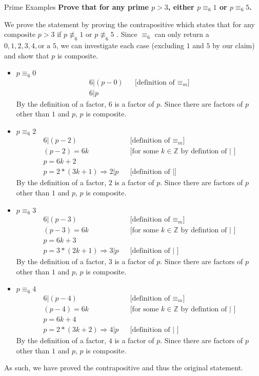 \documentclass[11pt, nopagenumbers]{adamblan-hw}
\begin{document}
\begin{question}{Prime Examples}
\textbf{Prove that for any prime $p > 3$, either $p \equiv_6 1$ or $p \equiv_6 5$.}

We prove the statement by proving the contrapositive which states that for any composite $p > 3$
if $p \not\equiv_6 1$ or $p \not\equiv_6 5$ . Since $\equiv_6$ can only return a
$0, 1, 2, 3, 4, \text{or a } 5$, we can investigate each case (excluding $1$ and $5$
by our claim) and show that $p$ is composite.

\begin{itemize}
\item{$p \equiv_6 0$}
\begin{align*}
6 | (p - 0) && \text{[definition of $\equiv_m$]} \\
6 | p
\end{align*}
By the definition of a factor, $6$ is a factor of $p$. Since there are factors of
$p$ other than $1$ and $p$, $p$ is composite. 

\item{$p \equiv_6 2$}
\begin{align*}
    6 | (p - 2) && \text{[definition of $\equiv_m$]} \\
    (p - 2) = 6k && \text{[for some $k \in \mathbb{Z}$ by defintion of | ]} \\
    p = 6k + 2 \\
    p = 2 * (3k + 1) \Rightarrow
    2 | p && \text{[definition of |]}
    \end{align*}
    By the definition of a factor, $2$ is a factor of $p$. Since there are factors of
    $p$ other than $1$ and $p$, $p$ is composite. 

\item{$p \equiv_6 3$}
\begin{align*}
    6 | (p - 3) && \text{[definition of $\equiv_m$]} \\
    (p - 3) = 6k && \text{[for some $k \in \mathbb{Z}$ by defintion of | ]} \\
    p = 6k + 3 \\
    p = 3 * (2k + 1) \Rightarrow
    3 | p && \text{[definition of | ]}
    \end{align*}
    By the definition of a factor, $3$ is a factor of $p$. Since there are factors of
    $p$ other than $1$ and $p$, $p$ is composite. 

\item{$p \equiv_6 4$}
    \begin{align*}
        6 | (p - 4) && \text{[definition of $\equiv_m$]} \\
        (p - 4) = 6k && \text{[for some $k \in \mathbb{Z}$ by defintion of | ]} \\
        p = 6k + 4 \\
        p = 2 * (3k + 2) \Rightarrow
        4 | p && \text{[definition of | ]}
    \end{align*}
        By the definition of a factor, $4$ is a factor of $p$. Since there are factors of
        $p$ other than $1$ and $p$, $p$ is composite. 
\end{itemize}

As such, we have proved the contrapositive and thus the original statement. 
\end{question}
\end{document}
